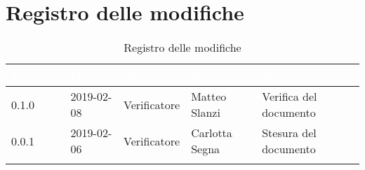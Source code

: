 \newpage

\section{Registro delle modifiche}

\begin{center}
\begin{longtable}[c]{|m{}|m{}|m{}|m{}|p{}|}
\hline
\rowcolor{bluelogo}\textbf{\textcolor{white}{Versione}} & \textbf{\textcolor{white}{Data}} & \textbf{\textcolor{white}{Ruolo}} & \textbf{\textcolor{white}{Autore}} & \textbf{\textcolor{white}{Descrizione}}\\
\hline 
\endfirsthead
\rowcolor{grigio} 0.1.0 & 2019-02-08 & Verificatore & Matteo Slanzi & Verifica del documento \\
0.0.1 & 2019-02-06 & Verificatore & Carlotta Segna & Stesura del documento \\
\hline
\caption{Registro delle modifiche}
\end{longtable}
\end{center}